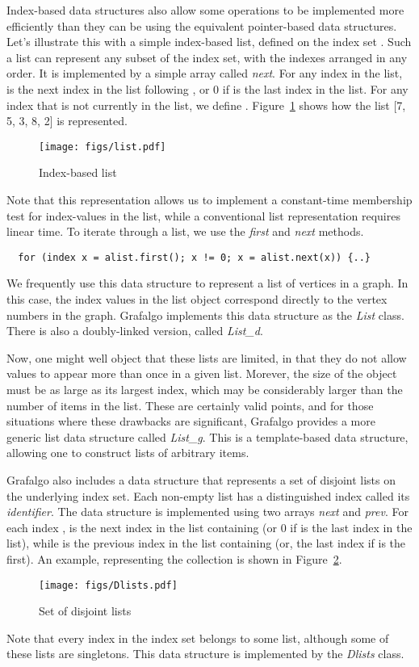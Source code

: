 \documentclass[11pt]{article}
\begin{document}
Index-based data structures also allow some operations to be implemented more efficiently than
they can be using the equivalent pointer-based data structures. 
Let's illustrate this with a simple index-based list,
defined on the index set . Such a list can represent any subset of the index set,
with the indexes arranged in any order. 
It is implemented by a simple array called {\sl next}. For any index  in the list,
 is the next index in the list following , or 0 if  is the last index in the list.
For any index  that is not currently in the list, we define .
Figure~\ref{indexList} shows how the list [7, 5, 3, 8, 2] is represented.
\begin{figure}[h]
\centerline{ \texttt{[image: figs/list.pdf]} }
\caption{Index-based list}
\label{indexList}
\end{figure}
Note that this representation allows us to implement a constant-time membership test for
index-values in the list, while a conventional list representation requires linear time.
To iterate through a list, we use the {\sl first} and {\sl next} methods.
\begin{verbatim}
  for (index x = alist.first(); x != 0; x = alist.next(x)) {..}
\end{verbatim}
We frequently use this data structure to represent a list of vertices in a graph.
In this case, the index values in the list object correspond directly to the vertex numbers in the graph.
Grafalgo implements this data structure as the {\sl List} class. 
There is also a doubly-linked version, called {\sl List\_d}.

Now, one might well object that these lists are limited, in that they do not allow
values to appear more than once in a given list. Morever, the size of the object must be as
large as its largest index, which may be considerably larger than the number of items in the list.
These are certainly valid points, and for those situations where these drawbacks are significant,
Grafalgo provides a more generic list data structure called {\sl List\_g}. 
This is a template-based data structure, allowing one to construct lists of arbitrary items.

Grafalgo also includes a data structure that represents a set of
disjoint lists on the underlying index set. Each non-empty list has a distinguished index
called its {\sl identifier}.
The data structure is implemented using two arrays {\sl next} and {\sl prev}.
For each index ,  is the next index in the list containing  (or 0 if 
is the last index in the list),
while  is the previous index in the list containing 
(or, the last index if  is the first).
An example, representing the collection  
is shown in Figure~\ref{Dlists}.
\begin{figure}[h]
\centerline{\texttt{[image: figs/Dlists.pdf]}}
\caption{Set of disjoint lists}
\label{Dlists}
\end{figure}
Note that every index in the index set belongs to some list, although some of these
lists are singletons. This data structure is implemented by the {\sl Dlists} class. 
\end{document}
